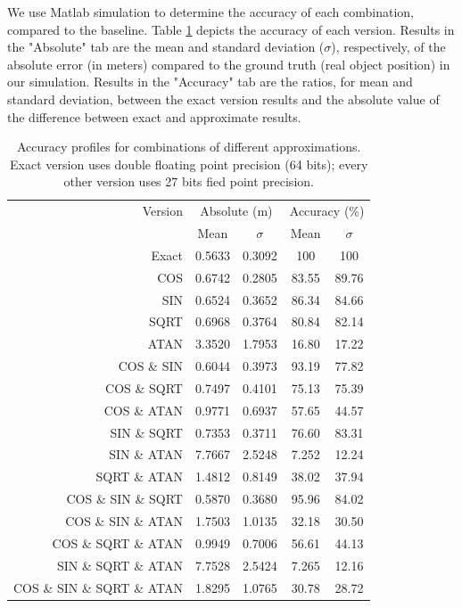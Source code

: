 \par We use Matlab simulation to determine the accuracy of each combination, compared to the baseline. Table \ref{table:acc_profiles} depicts the accuracy of each version. Results in the "Absolute" tab are the mean and standard deviation ($\sigma$), respectively, of the absolute error (in meters) compared to the ground truth (real object position) in our simulation. Results in the "Accuracy" tab are the ratios, for mean and standard deviation, between the exact version results and the absolute value of the difference between exact and approximate results.
    


\begin{table}[h]
\begin{tabular}{r c c c c}
\toprule
Version & \multicolumn{2}{c}{Absolute (m)} & \multicolumn{2}{c}{Accuracy (\%)}\\
 & Mean & $\sigma$ & Mean & $\sigma$\\
\hline
Exact	& 0.5633 & 0.3092 & 100 & 100\\
\hline
COS & 						0.6742	& 0.2805	& 83.55 & 89.76 \\
SIN & 						0.6524	& 0.3652	& 86.34 & 84.66 \\
SQRT & 						0.6968	& 0.3764	& 80.84 & 82.14 \\
ATAN & 						3.3520	& 1.7953	& 16.80 & 17.22 \\
COS \& SIN & 				0.6044	& 0.3973	& 93.19 & 77.82 \\
COS \& SQRT& 				0.7497	& 0.4101	& 75.13 & 75.39 \\
COS \& ATAN & 				0.9771	& 0.6937	& 57.65 & 44.57 \\
SIN \& SQRT & 				0.7353	& 0.3711	& 76.60 & 83.31 \\
SIN \& ATAN & 				7.7667	& 2.5248	& 7.252 & 12.24 \\
SQRT \& ATAN & 				1.4812	& 0.8149	& 38.02 & 37.94 \\
COS \& SIN \& SQRT & 		0.5870	& 0.3680	& 95.96 & 84.02 \\
COS \& SIN \& ATAN& 		1.7503	& 1.0135	& 32.18 & 30.50 \\
COS \& SQRT \& ATAN& 		0.9949	& 0.7006	& 56.61 & 44.13 \\
SIN \& SQRT \& ATAN  & 		7.7528	& 2.5424	& 7.265 & 12.16 \\
COS \& SIN \& SQRT \& ATAN &1.8295 	& 1.0765	& 30.78 & 28.72 \\
\hline
\end{tabular}
\caption{Accuracy profiles for combinations of different approximations. Exact version uses double floating point precision (64 bits); every other version uses 27 bits fied point precision.}
\label{table:acc_profiles}
\end{table}

